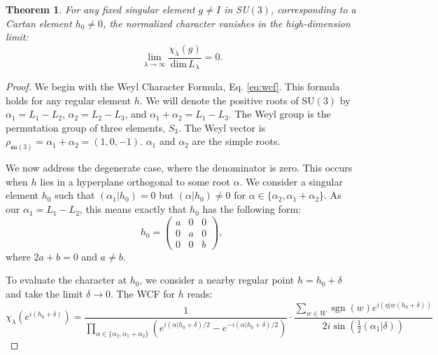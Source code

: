 \documentclass[11pt, a4paper]{article}
\DeclareMathOperator{\sgn}{sgn}
\newcommand{\dimL}{\mathrm{dim}\,L_\lambda}
\newcommand{\su}{\mathfrak{su}}
\newtheorem{theorem}{Theorem}[section]
\theoremstyle{definition}
\theoremstyle{remark}
\begin{document}
\begin{theorem}
For any fixed singular element $g \neq I$ in SU$(3)$, corresponding to a Cartan element $h_0 \neq 0$, the normalized character vanishes in the high-dimension limit:
\[
\lim_{\lambda \to \infty} \frac{\chi_\lambda(g)}{\dimL} = 0.
\]
\end{theorem}

\begin{proof}


We begin with the Weyl Character Formula, Eq. \eqref{eq:wcf}. This formula holds for any regular element $h$. We will denote the positive roots of SU$(3)$ by $\alpha_1 = L_1 - L_2$, $\alpha_2 = L_2 - L_3$, and $\alpha_1 + \alpha_2 = L_1 - L_3$. The Weyl group is the permutation group of three elements, $S_3$. The Weyl vector is $\rho_{\su(3)} = \alpha_1 + \alpha_2 = (1,0,-1)$. $\alpha_1$ and $\alpha_2$ are the simple roots.

We now address the degenerate case, where the denominator is zero. This occurs when $h$ lies in a hyperplane orthogonal to some root $\alpha$. We consider a singular element $h_0$ such that $(\alpha_1|h_0) = 0$ but $(\alpha|h_0) \neq 0$ for $\alpha \in \{\alpha_2, \alpha_1+\alpha_2\}$. As our $\alpha_1 = L_1 - L_2$, this means exactly that $h_0$ has the following form:
\[
h_0 = \begin{pmatrix}
    a & 0 & 0 \\
    0 & a & 0 \\
    0 & 0 & b
\end{pmatrix},
\]
where $2a+b=0$ and $a \neq b$.

To evaluate the character at $h_0$, we consider a nearby regular point $h = h_0 + \delta$ and take the limit $\delta \to 0$. The WCF for $h$ reads:
\begin{equation}
    \chi_\lambda(e^{i(h_0+\delta)}) = \frac{1}{\prod_{\alpha \in \{\alpha_2, \alpha_1+\alpha_2\}} \left(e^{i(\alpha|h_0+\delta)/2} - e^{-i(\alpha|h_0+\delta)/2}\right)} \cdot \frac{\sum_{w \in W} \sgn(w) e^{i(\eta|w(h_0+\delta))}}{2i\sin\left(\frac{1}{2}(\alpha_1|\delta)\right)}
\end{equation}


\end{proof}
\end{document}
